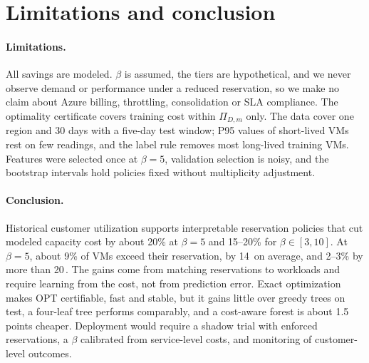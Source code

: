 \documentclass[10pt]{article}
\newcommand{\pp}{\,\text{pp}}
\begin{document}
\section{Limitations and conclusion}
\label{sec:conclusion}

\paragraph{Limitations.} All savings are modeled. $\beta$ is assumed, the tiers are hypothetical, and we never observe demand or performance under a reduced reservation, so we make no claim about Azure billing, throttling, consolidation or SLA compliance. The optimality certificate covers training cost within $\Pi_{D,m}$ only. The data cover one region and 30 days with a five-day test window; P95 values of short-lived VMs rest on few readings, and the label rule removes most long-lived training VMs. Features were selected once at $\beta=5$, validation selection is noisy, and the bootstrap intervals hold policies fixed without multiplicity adjustment.

\paragraph{Conclusion.} Historical customer utilization supports interpretable reservation policies that cut modeled capacity cost by about 20\% at $\beta=5$ and 15--20\% for $\beta\in[3,10]$. At $\beta=5$, about 9\% of VMs exceed their reservation, by 14\pp{} on average, and 2--3\% by more than 20\pp. The gains come from matching reservations to workloads and require learning from the cost, not from prediction error. Exact optimization makes OPT certifiable, fast and stable, but it gains little over greedy trees on test, a four-leaf tree performs comparably, and a cost-aware forest is about 1.5 points cheaper. Deployment would require a shadow trial with enforced reservations, a $\beta$ calibrated from service-level costs, and monitoring of customer-level outcomes.

{\footnotesize


}
\end{document}
